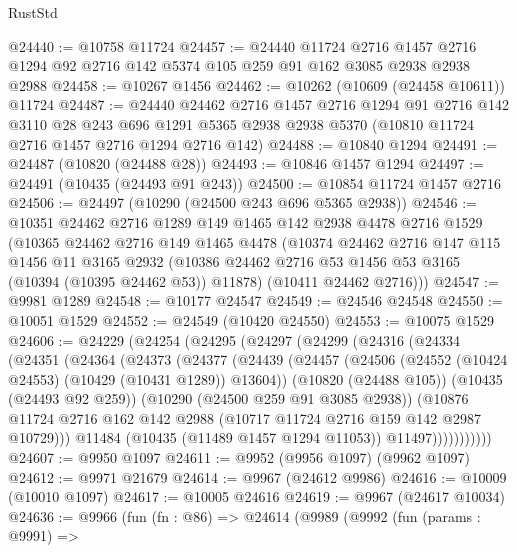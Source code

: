 \begin{lexlean}{RustStd}
\begin{coremodule}
@24440 := @10758 @11724
@24457 := @24440
    @11724
    @2716
    @1457
    @2716
    @1294
    @92
    @2716
    @142
    @5374
    @105
    @259
    @91
    @162
    @3085
    @2938
    @2938
    @2988
@24458 := @10267 @1456
@24462 := @10262 (@10609 (@24458 @10611)) @11724
@24487 := @24440
    @24462
    @2716
    @1457
    @2716
    @1294
    @91
    @2716
    @142
    @3110
    @28
    @243
    @696
    @1291
    @5365
    @2938
    @2938
    @5370
    (@10810 @11724 @2716 @1457 @2716 @1294 @2716 @142)
@24488 := @10840 @1294
@24491 := @24487 (@10820 (@24488 @28))
@24493 := @10846 @1457 @1294
@24497 := @24491 (@10435 (@24493 @91 @243))
@24500 := @10854 @11724 @1457 @2716
@24506 := @24497 (@10290 (@24500 @243 @696 @5365 @2938))
@24546 := @10351
    @24462
    @2716
    @1289
    @149
    @1465
    @142
    @2938
    @4478
    @2716
    @1529
    (@10365
      @24462
      @2716
      @149
      @1465
      @4478
      (@10374
        @24462
        @2716
        @147
        @115
        @1456
        @11
        @3165
        @2932
        (@10386 @24462 @2716 @53 @1456 @53 @3165 (@10394 (@10395 @24462 @53)) @11878)
        (@10411 @24462 @2716)))
@24547 := @9981 @1289
@24548 := @10177 @24547
@24549 := @24546 @24548
@24550 := @10051 @1529
@24552 := @24549 (@10420 @24550)
@24553 := @10075 @1529
@24606 := @24229
    (@24254
      (@24295
        (@24297
          (@24299
            (@24316
              (@24334
                (@24351
                  (@24364
                    (@24373
                      (@24377
                        (@24439
                          (@24457
                            (@24506 (@24552 (@10424 @24553) (@10429 (@10431 @1289)) @13604))
                            (@10820 (@24488 @105))
                            (@10435 (@24493 @92 @259))
                            (@10290 (@24500 @259 @91 @3085 @2938))
                            (@10876
                              @11724
                              @2716
                              @162
                              @142
                              @2988
                              (@10717 @11724 @2716 @159 @142 @2987 @10729)))
                          @11484
                          (@10435 (@11489 @1457 @1294 @11053))
                          @11497)))))))))))
@24607 := @9950 @1097
@24611 := @9952 (@9956 @1097) (@9962 @1097)
@24612 := @9971 @21679
@24614 := @9967 (@24612 @9986)
@24616 := @10009 (@10010 @1097)
@24617 := @10005 @24616
@24619 := @9967 (@24617 @10034)
@24636 := @9966
    (fun (fn : @86) =>
    @24614
      (@9989
        (@9992
          (fun (params : @9991) =>

\end{coremodule}
\end{lexlean}
